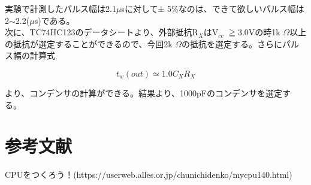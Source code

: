 \documentclass[xelatex,ja=standard,jafont=noto]{bxjsarticle}
\begin{document}
実験で計測したパルス幅は2.1$ \mu $sに対して± 5$  \%  $なのは、できて欲しいパルス幅は2$  \sim $2.2($ \mu $s)である。\\

次に、TC74HC123のデータシートより、外部抵抗R$ _{X} $はV$ _{cc} $ $ \geqq $3.0Vの時1k $ \Omega $以上の抵抗が選定することができるので、今回2k $ \Omega $の抵抗を選定する。さらにパルス幅の計算式

\begin{equation}
		t_{w}(out)\simeq 1.0C_{X}R_{X}
\end{equation}

より、コンデンサの計算ができる。結果より、1000pFのコンデンサを選定する。


\section{参考文献}

CPUをつくろう！(https://userweb.alles.or.jp/chunichidenko/mycpu140.html)
\end{document}
